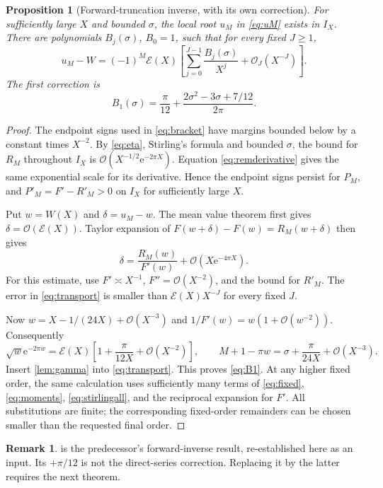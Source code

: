\documentclass[11pt,a4paper]{article}
\newtheorem{proposition}[theorem]{Proposition}
\theoremstyle{definition}
\newtheorem{remark}[theorem]{Remark}
\numberwithin{equation}{section}
\newcommand{\e}{\mathrm e}
\newcommand{\Oh}{\mathcal O}
\newcommand{\scal}{\mathcal E}
\begin{document}
\begin{proposition}[Forward-truncation inverse, with its own correction]
\label{prop:forwardinverse}
For sufficiently large $X$ and bounded $\sigma$, the local root $u_M$ in \eqref{eq:uM} exists in $I_X$. There are polynomials $B_j(\sigma)$, $B_0=1$, such that for every fixed $J\ge1$,
\begin{equation}
 u_M-W=(-1)^M\scal(X)
 \left[\sum_{j=0}^{J-1}\frac{B_j(\sigma)}{X^j}+\Oh_J(X^{-J})\right].
 \label{eq:Bexp}
\end{equation}
The first correction is
\begin{equation}
 B_1(\sigma)=\frac\pi{12}
       +\frac{2\sigma^2-3\sigma+7/12}{2\pi}.
 \label{eq:B1}
\end{equation}
\end{proposition}
\begin{proof}
The endpoint signs used in \eqref{eq:bracket} have margins bounded below by a constant times $X^{-2}$. By \eqref{eq:eta}, Stirling's formula and bounded $\sigma$, the bound for $R_M$ throughout $I_X$ is $\Oh(X^{-1/2}\e^{-2\pi X})$. Equation \eqref{eq:remderivative} gives the same exponential scale for its derivative. Hence the endpoint signs persist for $P_M$, and $P'_M=F'-R'_M>0$ on $I_X$ for sufficiently large $X$.

Put $w=W(X)$ and $\delta=u_M-w$. The mean value theorem first gives $\delta=\Oh(\scal(X))$. Taylor expansion of
$F(w+\delta)-F(w)=R_M(w+\delta)$ then gives
\begin{equation}
 \delta=\frac{R_M(w)}{F'(w)}+\Oh(X\e^{-4\pi X}).
 \label{eq:transport}
\end{equation}
For this estimate, use $F'\asymp X^{-1}$, $F''=\Oh(X^{-2})$, and the bound for $R'_M$. The error in \eqref{eq:transport} is smaller than $\scal(X)X^{-J}$ for every fixed $J$.

Now $w=X-1/(24X)+\Oh(X^{-3})$ and
$1/F'(w)=w(1+\Oh(w^{-2}))$. Consequently
\[
 \sqrt w\e^{-2\pi w}=\scal(X)
   \left[1+\frac\pi{12X}+\Oh(X^{-2})\right],
 \qquad
 M+1-\pi w=\sigma+\frac\pi{24X}+\Oh(X^{-3}).
\]
Insert \cref{lem:gamma} into \eqref{eq:transport}. This proves \eqref{eq:B1}. At any higher fixed order, the same calculation uses sufficiently many terms of \eqref{eq:fixed}, \eqref{eq:moments}, \eqref{eq:stirlingall}, and the reciprocal expansion for $F'$. All substitutions are finite; the corresponding fixed-order remainders can be chosen smaller than the requested final order.
\end{proof}

\begin{remark}
 is the predecessor's forward-inverse result, re-established here as an input. Its $+\pi/12$ is not the direct-series correction. Replacing it by the latter requires the next theorem.
\end{remark}
\end{document}
